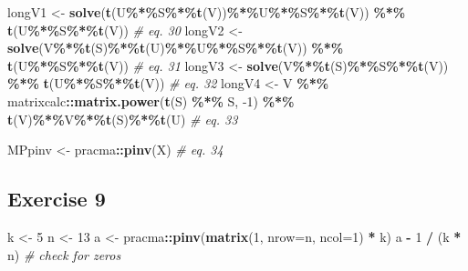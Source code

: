 \documentclass[
]{book}
\newenvironment{Shaded}{\begin{snugshade}}{\end{snugshade}}
\newcommand{\CommentTok}[1]{\textcolor[rgb]{0.56,0.35,0.01}{\textit{#1}}}
\newcommand{\DataTypeTok}[1]{\textcolor[rgb]{0.13,0.29,0.53}{#1}}
\newcommand{\DecValTok}[1]{\textcolor[rgb]{0.00,0.00,0.81}{#1}}
\newcommand{\KeywordTok}[1]{\textcolor[rgb]{0.13,0.29,0.53}{\textbf{#1}}}
\newcommand{\NormalTok}[1]{#1}
\newcommand{\OperatorTok}[1]{\textcolor[rgb]{0.81,0.36,0.00}{\textbf{#1}}}
\newcommand{\StringTok}[1]{\textcolor[rgb]{0.31,0.60,0.02}{#1}}
\begin{document}
\begin{Shaded}
\begin{Highlighting}[]
\NormalTok{longV1 \textless{}{-}}\StringTok{ }\KeywordTok{solve}\NormalTok{(}\KeywordTok{t}\NormalTok{(U}\OperatorTok{\%*\%}\NormalTok{S}\OperatorTok{\%*\%}\KeywordTok{t}\NormalTok{(V))}\OperatorTok{\%*\%}\NormalTok{U}\OperatorTok{\%*\%}\NormalTok{S}\OperatorTok{\%*\%}\KeywordTok{t}\NormalTok{(V)) }\OperatorTok{\%*\%}\StringTok{ }\KeywordTok{t}\NormalTok{(U}\OperatorTok{\%*\%}\NormalTok{S}\OperatorTok{\%*\%}\KeywordTok{t}\NormalTok{(V)) }\CommentTok{\# eq. 30}
\NormalTok{longV2 \textless{}{-}}\StringTok{ }\KeywordTok{solve}\NormalTok{(V}\OperatorTok{\%*\%}\KeywordTok{t}\NormalTok{(S)}\OperatorTok{\%*\%}\KeywordTok{t}\NormalTok{(U)}\OperatorTok{\%*\%}\NormalTok{U}\OperatorTok{\%*\%}\NormalTok{S}\OperatorTok{\%*\%}\KeywordTok{t}\NormalTok{(V)) }\OperatorTok{\%*\%}\StringTok{ }\KeywordTok{t}\NormalTok{(U}\OperatorTok{\%*\%}\NormalTok{S}\OperatorTok{\%*\%}\KeywordTok{t}\NormalTok{(V)) }\CommentTok{\# eq. 31}
\NormalTok{longV3 \textless{}{-}}\StringTok{ }\KeywordTok{solve}\NormalTok{(V}\OperatorTok{\%*\%}\KeywordTok{t}\NormalTok{(S)}\OperatorTok{\%*\%}\NormalTok{S}\OperatorTok{\%*\%}\KeywordTok{t}\NormalTok{(V)) }\OperatorTok{\%*\%}\StringTok{ }\KeywordTok{t}\NormalTok{(U}\OperatorTok{\%*\%}\NormalTok{S}\OperatorTok{\%*\%}\KeywordTok{t}\NormalTok{(V)) }\CommentTok{\# eq. 32}
\NormalTok{longV4 \textless{}{-}}\StringTok{ }\NormalTok{V }\OperatorTok{\%*\%}\StringTok{ }\NormalTok{matrixcalc}\OperatorTok{::}\KeywordTok{matrix.power}\NormalTok{(}\KeywordTok{t}\NormalTok{(S) }\OperatorTok{\%*\%}\StringTok{ }\NormalTok{S, }\DecValTok{{-}1}\NormalTok{) }\OperatorTok{\%*\%}\StringTok{ }\KeywordTok{t}\NormalTok{(V)}\OperatorTok{\%*\%}\NormalTok{V}\OperatorTok{\%*\%}\KeywordTok{t}\NormalTok{(S)}\OperatorTok{\%*\%}\KeywordTok{t}\NormalTok{(U) }\CommentTok{\# eq. 33 }

\NormalTok{MPpinv \textless{}{-}}\StringTok{ }\NormalTok{pracma}\OperatorTok{::}\KeywordTok{pinv}\NormalTok{(X) }\CommentTok{\# eq. 34}
\end{Highlighting}
\end{Shaded}

\hypertarget{exercise-9}{%
\subsection*{Exercise 9}\label{exercise-9}}

\begin{Shaded}
\begin{Highlighting}[]
\NormalTok{k \textless{}{-}}\StringTok{ }\DecValTok{5}
\NormalTok{n \textless{}{-}}\StringTok{ }\DecValTok{13}
\NormalTok{a \textless{}{-}}\StringTok{ }\NormalTok{pracma}\OperatorTok{::}\KeywordTok{pinv}\NormalTok{(}\KeywordTok{matrix}\NormalTok{(}\DecValTok{1}\NormalTok{, }\DataTypeTok{nrow=}\NormalTok{n, }\DataTypeTok{ncol=}\DecValTok{1}\NormalTok{) }\OperatorTok{*}\StringTok{ }\NormalTok{k)}
\NormalTok{a }\OperatorTok{{-}}\StringTok{ }\DecValTok{1} \OperatorTok{/}\StringTok{ }\NormalTok{(k }\OperatorTok{*}\StringTok{ }\NormalTok{n) }\CommentTok{\# check for zeros}
\end{Highlighting}
\end{Shaded}
\end{document}

